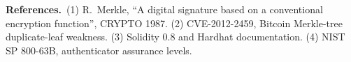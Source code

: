 \documentclass[10pt,a4paper]{article}
\begin{document}
\vspace{2pt}
{\footnotesize\color{ink!80}\textbf{References.}\ (1) R.~Merkle, ``A digital signature based on a conventional encryption function'', CRYPTO 1987.
(2) CVE-2012-2459, Bitcoin Merkle-tree duplicate-leaf weakness. (3) Solidity 0.8 and Hardhat documentation.
(4) NIST SP 800-63B, authenticator assurance levels.\par}
\end{document}
